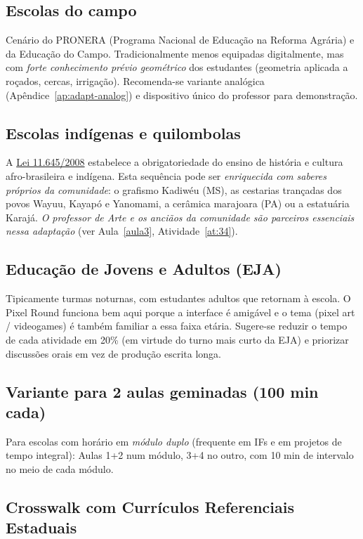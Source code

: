 \documentclass[12pt,a4paper]{scrartcl}
\begin{document}
\subsection{Escolas do campo}
Cenário do PRONERA (Programa Nacional de Educação na Reforma Agrária) e da Educação do Campo. Tradicionalmente menos equipadas digitalmente, mas com \emph{forte conhecimento prévio geométrico} dos estudantes (geometria aplicada a roçados, cercas, irrigação). Recomenda-se variante analógica (Apêndice~\ref{ap:adapt-analog}) e dispositivo único do professor para demonstração.

\subsection{Escolas indígenas e quilombolas}
A \href{https://www.planalto.gov.br/ccivil_03/_ato2007-2010/2008/lei/l11645.htm}{Lei 11.645/2008} estabelece a obrigatoriedade do ensino de história e cultura afro-brasileira e indígena. Esta sequência pode ser \emph{enriquecida com saberes próprios da comunidade}: o grafismo Kadiwéu (MS), as cestarias trançadas dos povos Wayuu, Kayapó e Yanomami, a cerâmica marajoara (PA) ou a estatuária Karajá. \emph{O professor de Arte e os anciãos da comunidade são parceiros essenciais nessa adaptação} (ver Aula~\ref{aula3}, Atividade~\ref{at:34}).

\subsection{Educação de Jovens e Adultos (EJA)}
Tipicamente turmas noturnas, com estudantes adultos que retornam à escola. O Pixel Round funciona bem aqui porque a interface é amigável e o tema (pixel art / videogames) é também familiar a essa faixa etária. Sugere-se reduzir o tempo de cada atividade em 20\% (em virtude do turno mais curto da EJA) e priorizar discussões orais em vez de produção escrita longa.

\subsection{Variante para 2 aulas geminadas (100 min cada)}
Para escolas com horário em \emph{módulo duplo} (frequente em IFs e em projetos de tempo integral): Aulas 1+2 num módulo, 3+4 no outro, com 10 min de intervalo no meio de cada módulo.

\subsection{Crosswalk com Currículos Referenciais Estaduais}
\end{document}

